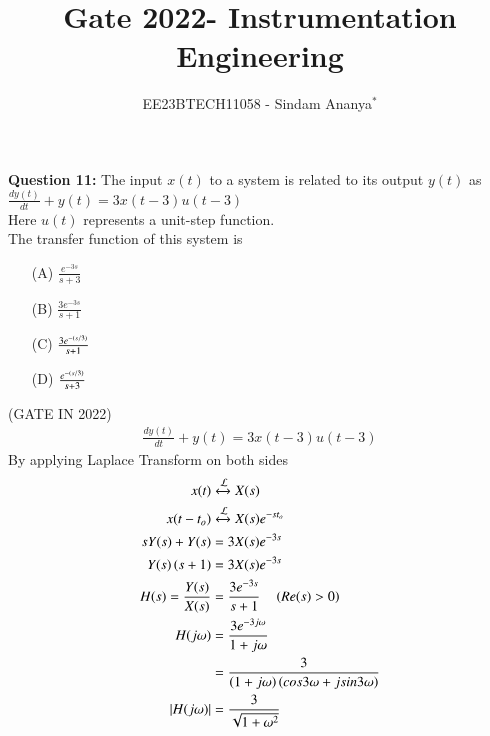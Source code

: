 \documentclass[journal,12pt,twocolumn]{IEEEtran}
\theoremstyle{remark}
\begin{document}

\vspace{3cm}

\title{Gate 2022- Instrumentation Engineering}
\author{EE23BTECH11058 - Sindam Ananya$^{*}$%
}
\maketitle
\newpage
\bigskip

\renewcommand{\thefigure}{\theenumi}
\renewcommand{\thetable}{\theenumi}

\vspace{3cm}
\textbf{Question 11:} 
The input $x(t)$ to a system is related to its output $y(t)$ as \\
$\frac{dy(t)}{dt} + y(t) = 3x(t-3)u(t-3)$\\
Here $u(t)$ represents a unit-step function.\\
The transfer function of this system is 
\begin{enumerate}
\item[(A)] $\frac{e^{-3s}}{s+3}$\\
\item[(B)] $\frac{3e^{-3s}}{s+1}$\\
\item[(C)] $\frac{3e^{-\left(s/3\right)}}{s+1}$\\
\item[(D)] $\frac{e^{-\left(s/3\right)}}{s+3}$
\end{enumerate}
\hfill{(GATE IN 2022)}\\
\solution
\begin{align}
\frac{dy(t)}{dt} + y(t) = 3x(t-3)u(t-3)
\end{align}
By applying Laplace Transform on both sides\\
\begin{align}
x(t) &\xleftrightarrow{\mathcal{L}} X(s)\\
x(t-t_o) &\xleftrightarrow{\mathcal{L}} X(s)e^{-st_o}\\
sY(s) + Y(s) &= 3X(s)e^{-3s}\\
Y(s)\left(s+1\right) &= 3X(s)e^{-3s}\\
H(s) = \frac{Y(s)}{X(s)} &= \frac{3e^{-3s}}{s+1} \quad \left(Re(s)>0\right)\\
H(j\omega) &= \frac{3e^{-3j\omega}}{1+j\omega}\\
&= \frac{3}{\left(1+j\omega\right)\left(cos3\omega + jsin3\omega\right)}\\
\lvert{H(j\omega)} \rvert&= \frac{3}{\sqrt{1+\omega^{2}}}
\end{align}
\end{document}

